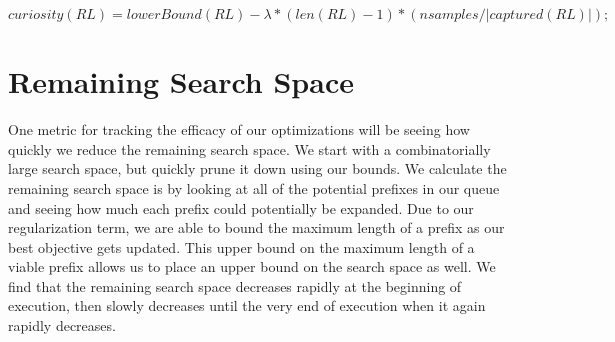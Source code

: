 $$curiosity(RL) = lowerBound(RL) - \lambda * (len(RL) - 1)  * (nsamples / |captured(RL)|);$$

\section{Remaining Search Space}
One metric for tracking the efficacy of our optimizations will be seeing how quickly we reduce the remaining search space.
We start with a combinatorially large search space, but quickly prune it down using our bounds.
We calculate the remaining search space is by looking at all of the potential prefixes in our  queue and seeing how much each prefix could potentially be expanded.
Due to our regularization term, we are able to bound the maximum length of a prefix as our best objective gets updated.
This upper bound on the maximum length of a viable prefix allows us to place an upper bound on the search space as well.
We find that the remaining search space decreases rapidly at the beginning of execution, then slowly decreases until the very end of execution when it again rapidly decreases.